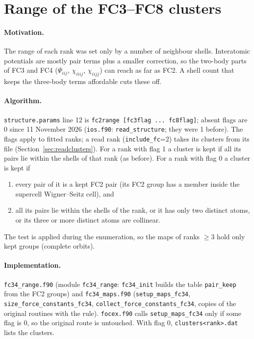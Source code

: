 \documentclass[11pt,a4paper]{article}
\newcommand{\code}[1]{\texttt{#1}}
\begin{document}
\section{Range of the FC3--FC8 clusters}\label{sec:fc34}
\paragraph{Motivation.} The range of each rank was set only by a number of neighbour shells. Interatomic
potentials are mostly pair terms plus a smaller correction, so the two-body parts of FC3 and FC4
($\Psi_{iij}$, $\chi_{iiij}$, $\chi_{iijj}$) can reach as far as FC2. A shell count that keeps the
three-body terms affordable cuts these off.

\paragraph{Algorithm.} \code{structure.params} line 12 is \code{fc2range [fc3flag ... fc8flag]}; absent
flags are 0 since 11 November 2026 (\code{ios.f90}: \code{read\_structure}; they were 1 before). The flags apply
to fitted ranks; a read rank (\code{include\_fc}=2) takes its clusters from its file (Section~\ref{sec:readclusters}). For a rank with flag 1 a cluster is kept if all its pairs lie within the shells of that
rank (as before). For a rank with flag 0 a cluster is kept if
\begin{enumerate}
\item every pair of it is a kept FC2 pair (its FC2 group has a member inside the supercell
Wigner--Seitz cell), and
\item all its pairs lie within the shells of the rank, or it has only two distinct atoms, or its three or
more distinct atoms are collinear.
\end{enumerate}
The test is applied during the enumeration, so the maps of ranks $\ge3$ hold only kept groups (complete
orbits).

\paragraph{Implementation.} \code{fc34\_range.f90} (module \code{fc34\_range}: \code{fc34\_init} builds the
table \code{pair\_keep} from the FC2 groups) and \code{fc34\_maps.f90} (\code{setup\_maps\_fc34},
\code{size\_force\_constants\_fc34}, \code{collect\_force\_constants\_fc34}, copies of the original
routines with the rule). \code{focex.f90} calls \code{setup\_maps\_fc34} only if some flag is 0, so the
original route is untouched. With flag 0, \code{clusters<rank>.dat} lists the clusters.
\end{document}

